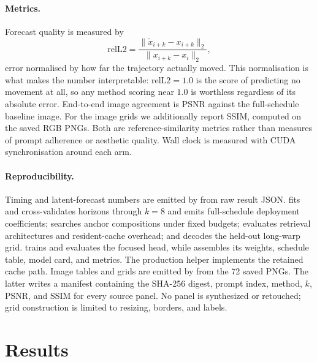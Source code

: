 \documentclass[11pt,a4paper]{article}
\newcommand{\relltwo}{\ensuremath{\mathrm{relL2}}}
\begin{document}
\paragraph{Metrics.} Forecast quality is measured by
\begin{equation}
  \relltwo = \frac{\lVert \tilde{x}_{i+k} - x_{i+k} \rVert_2}
                  {\lVert x_{i+k} - x_i \rVert_2},
\end{equation}
error normalised by how far the trajectory actually moved. This normalisation is
what makes the number interpretable: $\relltwo = 1.0$ is the score of predicting
no movement at all, so any method scoring near $1.0$ is worthless regardless of
its absolute error. End-to-end image agreement is PSNR against the full-schedule
baseline image. For the image grids we additionally report SSIM, computed on the
saved RGB PNGs. Both are reference-similarity metrics rather than measures of
prompt adherence or aesthetic quality. Wall clock is measured with CUDA
synchronisation around each arm.

\begin{sloppypar}
\paragraph{Reproducibility.} Timing and latent-forecast numbers are emitted by
 from raw result JSON.
 fits and cross-validates horizons through
$k=8$ and emits full-schedule deployment coefficients;
 searches anchor compositions under fixed
budgets;  evaluates retrieval architectures and
resident-cache overhead; and  decodes the
held-out long-warp grid.  trains and
evaluates the focused head, while 
assembles its weights, schedule table, model card, and metrics. The production helper
 implements the retained cache path.
Image tables and grids are
emitted by  from the 72 saved PNGs.
The latter writes a manifest containing the SHA-256 digest, prompt index,
method, $k$, PSNR, and SSIM for every source panel. No panel is synthesized or
retouched; grid construction is limited to resizing, borders, and labels.
\end{sloppypar}

\section{Results}
\end{document}
